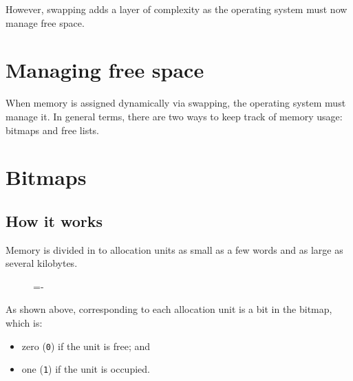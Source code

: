 \documentclass[a4paper]{systems-software}
\begin{document}
However, swapping adds a layer of complexity as the operating system must now manage free space.


\newpage

\section{Managing free space}

When memory is assigned dynamically via swapping, the operating system must manage it. In general terms, there are two ways to keep track of memory usage: bitmaps and free lists.


\section*{Bitmaps}

\subsection*{How it works}

Memory is divided in to allocation units as small as a few words and as large as several kilobytes.

\begin{figure}[H]
  \lineskip=-\fboxrule
\end{figure}

As shown above, corresponding to each allocation unit is a bit in the bitmap, which is:
\begin{itemize}
	\item zero (\texttt{0}) if the unit is free; and
	\item one (\texttt{1}) if the unit is occupied.
\end{itemize}
\end{document}
